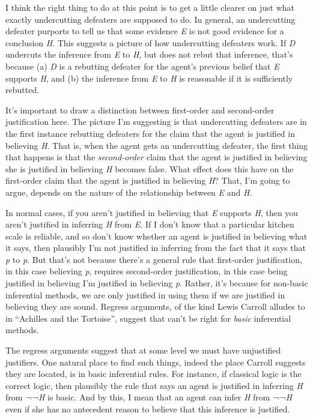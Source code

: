\documentclass[
  10pt,
  letterpaper,
  DIV=11,
  numbers=noendperiod,
  twoside]{scrartcl}
\begin{document}
I think the right thing to do at this point is to get a little clearer
on just what exactly undercutting defeaters are supposed to do. In
general, an undercutting defeater purports to tell us that some evidence
\emph{E} is not good evidence for a conclusion \emph{H}. This suggests a
picture of how undercutting defeaters work. If \emph{D} undercuts the
inference from \emph{E} to \emph{H}, but does not rebut that inference,
that's because (a) \emph{D} is a rebutting defeater for the agent's
previous belief that \emph{E} supports \emph{H}, and (b) the inference
from \emph{E} to \emph{H} is reasonable if it is sufficiently rebutted.

It's important to draw a distinction between first-order and
second-order justification here. The picture I'm suggesting is that
undercutting defeaters are in the first instance rebutting defeaters for
the claim that the agent is justified in believing \emph{H}. That is,
when the agent gets an undercutting defeater, the first thing that
happens is that the \emph{second-order} claim that the agent is
justified in believing she is justified in believing \emph{H} becomes
false. What effect does this have on the first-order claim that the
agent is justified in believing \emph{H}? That, I'm going to argue,
depends on the nature of the relationship between \emph{E} and \emph{H}.

In normal cases, if you aren't justified in believing that \emph{E}
supports \emph{H}, then you aren't justified in inferring \emph{H} from
\emph{E}. If I don't know that a particular kitchen scale is reliable,
and so don't know whether an agent is justified in believing what it
says, then plausibly I'm not justified in inferring from the fact that
it says that \emph{p} to \emph{p}. But that's not because there's a
general rule that first-order justification, in this case believing
\emph{p}, requires second-order justification, in this case being
justified in believing I'm justified in believing \emph{p}. Rather, it's
because for non-basic inferential methods, we are only justified in
using them if we are justified in believing they are sound. Regress
arguments, of the kind Lewis Carroll alludes to in ``Achilles and the
Tortoise'', suggest that can't be right for \emph{basic} inferential
methods.

The regress arguments suggest that at some level we must have
unjustified justifiers. One natural place to find such things, indeed
the place Carroll suggests they are located, is in basic inferential
rules. For instance, if classical logic is the correct logic, then
plausibly the rule that says an agent is justified in inferring \emph{H}
from ¬¬\emph{H} is basic. And by this, I mean that an agent can infer
\emph{H} from ¬¬\emph{H} even if she has no antecedent reason to believe
that this inference is justified.
\end{document}
